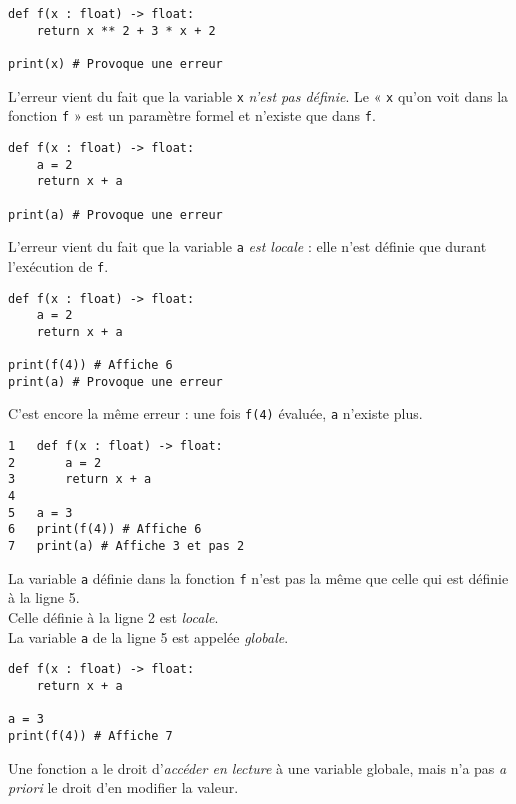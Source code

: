 \begin{pyc}
\begin{verbatim}
def f(x : float) -> float:
    return x ** 2 + 3 * x + 2
    
print(x) # Provoque une erreur
\end{verbatim}
\end{pyc}
L'erreur vient du fait que la variable \texttt{x} \textit{n'est pas définie}. Le  «  \texttt{x} qu'on voit dans la fonction \texttt{f} »  est un paramètre formel et n'existe que dans \texttt{f}.\\


\begin{pyc}
\begin{verbatim}
def f(x : float) -> float:
    a = 2
    return x + a

print(a) # Provoque une erreur
    \end{verbatim}
\end{pyc}
L'erreur vient du fait que la variable \texttt{a} \textit{est locale} : elle n'est définie que durant l'exécution de \texttt{f}.\\

\begin{pyc}
\begin{verbatim}
def f(x : float) -> float:
    a = 2
    return x + a

print(f(4)) # Affiche 6        
print(a) # Provoque une erreur
    \end{verbatim}
\end{pyc}
C'est encore la même erreur : une fois \texttt{f(4)} évaluée, \texttt{a} n'existe plus.\\

\begin{pyc}
\begin{verbatim}
1   def f(x : float) -> float:
2       a = 2
3       return x + a
4
5   a = 3
6   print(f(4)) # Affiche 6
7   print(a) # Affiche 3 et pas 2
\end{verbatim}
\end{pyc}

La variable \texttt{a} définie dans la fonction \texttt{f} n'est pas la même que celle qui est définie à la ligne 5.\\
Celle définie à la ligne 2 est \textit{locale}.\\
La variable \texttt{a} de la ligne 5 est appelée \textit{globale}.\\



\begin{pyc}
\begin{verbatim}
def f(x : float) -> float:
    return x + a
        
a = 3
print(f(4)) # Affiche 7
\end{verbatim}
\end{pyc}
\begin{aretenir}
Une fonction a le droit d'\textit{accéder en lecture} à une variable globale, mais n'a pas \textit{a priori} le droit d'en modifier la valeur.
\end{aretenir}

